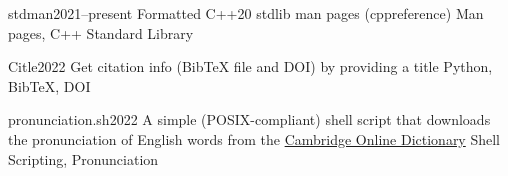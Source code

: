 %
%
%


\begin{projects}
	\project
	{stdman}{2021--present}
	{}
    {Formatted C++20 stdlib man pages (cppreference)}
	{Man pages, C++ Standard Library}

	\project
	{Citle}{2022}
	{}
	{Get citation info (BibTeX file and DOI) by providing a title}
	{Python, BibTeX, DOI}

    \project
    {pronunciation.sh}{2022}
    {}
    {A simple (POSIX-compliant) shell script that downloads the pronunciation of English words from the \href{https://dictionary.cambridge.org}{Cambridge Online Dictionary}}
    {Shell Scripting, Pronunciation}


\end{projects}

